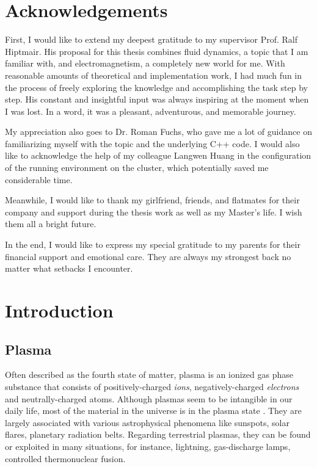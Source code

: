 \documentclass{report}
\begin{document}
\chapter*{Acknowledgements}
First, I would like to extend my deepest gratitude to my supervisor Prof. Ralf Hiptmair. His proposal for this thesis combines fluid dynamics, a topic that I am familiar with, and electromagnetism, a completely new world for me. With reasonable amounts of theoretical and implementation work, I had much fun in the process of freely exploring the knowledge and accomplishing the task step by step. His constant and insightful input was always inspiring at the moment when I was lost. In a word, it was a pleasant, adventurous, and memorable journey.

My appreciation also goes to Dr. Roman Fuchs, who gave me a lot of guidance on familiarizing myself with the topic and the underlying C++ code. I would also like to acknowledge the help of my colleague Langwen Huang in the configuration of the running environment on the cluster, which potentially saved me considerable time.

Meanwhile, I would like to thank my girlfriend, friends, and flatmates for their company and support during the thesis work as well as my Master's life. I wish them all a bright future.  

In the end, I would like to express my special gratitude to my parents for their financial support and emotional care. They are always my strongest back no matter what setbacks I encounter.



\tableofcontents
\chapter{Introduction}
\section{Plasma}
Often described as the fourth state of matter, plasma is an ionized gas phase substance that consists of positively-charged \emph{ions}, negatively-charged \emph{electrons} and neutrally-charged atoms. Although plasmas seem to be intangible in our daily life, most of the material in the universe is in the plasma state \citep{gurnett2005}. They are largely associated with various astrophysical phenomena like sunspots, solar flares, planetary radiation belts. Regarding terrestrial plasmas, they can be found or exploited in many situations, for instance, lightning, gas-discharge lamps, controlled thermonuclear fusion.     
\end{document}
